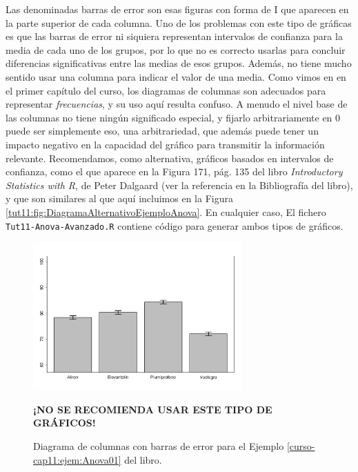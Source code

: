 \documentclass[10pt,a4paper]{article}\usepackage[]{graphicx}\usepackage[]{color}
\newcounter {cont01}
\begin{document}
Las denominadas {\sf barras de error} son esas figuras con forma de I que aparecen en la parte superior de cada columna. Uno de los problemas con este tipo de gráficas es que las barras de error ni siquiera representan intervalos de confianza para la media de cada uno de los grupos, por lo que no es correcto usarlas para concluir diferencias significativas entre las medias de esos grupos. Además, no tiene mucho sentido usar una columna para indicar el valor de una media. Como vimos en en el primer capítulo del curso, los diagramas de columnas son adecuados para representar {\em frecuencias}, y su uso aquí resulta confuso. A menudo el nivel base de las columnas no tiene ningún significado especial, y fijarlo arbitrariamente en $0$ puede ser simplemente eso, una arbitrariedad, que además puede tener un impacto negativo en la capacidad del gráfico para transmitir la información relevante. Recomendamos, como alternativa, gráficos basados en intervalos de confianza, como el que aparece en la Figura 171, pág. 135 del libro {\em Introductory Statistics with R}, de Peter Dalgaard (ver la referencia en la Bibliografía del libro), y que son similares al que aquí incluimos en la Figura \ref{tut11:fig:DiagramaAlternativoEjemploAnova}. En cualquier caso, El fichero {\tt Tut11-Anova-Avanzado.R} contiene código para generar ambos tipos de gráficos.

%

\begin{figure}[htb]
\begin{center}
    \includegraphics[width=8cm]{../fig/Tut11-04.png}
\end{center}
\caption{Diagrama de columnas con barras de error para el Ejemplo \ref{curso-cap11:ejem:Anova01} del libro.}\centering
{\bf ¡NO SE RECOMIENDA USAR ESTE TIPO DE GRÁFICOS!}
\label{tut11:fig:BargraphEjemploAnova}
\end{figure}
\end{document}
